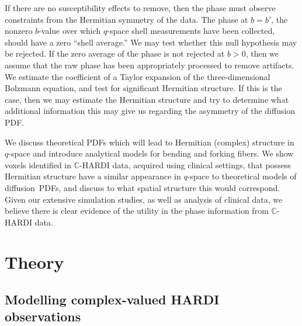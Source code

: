 \documentclass[authoryear,preprint,12pt]{elsarticle}
\newcommand{\bbC}{\mathbb{C}}
\begin{document}
If there are no susceptibility effects to remove, then the phase must
observe constraints from the Hermitian symmetry of the data.  The
phase at $b=b'$, the nonzero $b$-value over which $q$-space shell
measurements have been collected, should have a zero ``shell
average.''  We may test whether this null hypothesis may be rejected.
If the zero average of the phase is not rejected at $b>0$, then we
assume that the raw phase has been appropriately processed to remove
artifacts.  We estimate the coefficient of a Taylor expansion of the
three-dimensional Bolzmann equation, and test for significant
Hermitian structure.  If this is the case, then we may estimate the
Hermitian structure and try to determine what additional information
this may give us regarding the asymmetry of the diffusion PDF.

We discuss theoretical PDFs which will lead to Hermitian (complex)
structure in $q$-space and introduce analytical models for bending and
forking fibers.  We show voxels identified in $\bbC$-HARDI data,
acquired using clinical settings, that possess Hermitian structure
have a similar appearance in $q$-space to theoretical models of
diffusion~PDFs, and discuss to what spatial structure this would
correspond.  Given our extensive simulation studies, as well as
analysis of clinical data, we believe there is clear evidence of the
utility in the phase information from $\bbC$-HARDI data.

\section{Theory}

\subsection{Modelling complex-valued HARDI observations}
\label{modelling}
\end{document}
